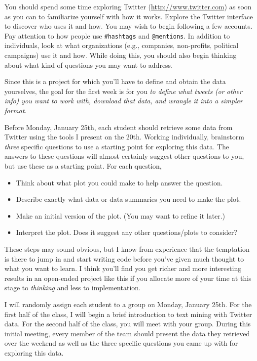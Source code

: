 \documentclass[11pt, oneside]{article}   	%
\begin{document}
You should spend some time exploring Twitter (\url{http://www.twitter.com}) as
soon as you can to familiarize yourself with how it works.  Explore the Twitter
interface to discover who uses it and how. You may wish to begin following
a few accounts.  Pay attention to how people use \verb|#hashtags| and
\verb|@mentions|.  In addition to individuals, look at what organizations
(e.g., companies, non-profits, political campaigns) use it and how.  While
doing this, you should also begin thinking about what kind of questions you may
want to address.

Since this is a project for which you'll have to define and obtain the data
yourselves, the goal for the first week is for you \emph{to define what tweets
(or other info) you want to work with, download that data, and wrangle it into
a simpler format}. 

Before Monday, January 25th, each student should retrieve some data from
Twitter using the tools I present on the 20th.  Working individually, 
brainstorm {\em three} specific
questions to use a starting point for exploring this data. The answers to these
questions will almost certainly suggest other questions to you, but use these
as a starting point.  For each question,
\begin{itemize}
\item Think about what plot you could make to help answer the question.
\item Describe exactly what data or data summaries you need to make the plot.
\item Make an initial version of the plot. (You may want to refine it later.)
\item Interpret the plot. Does it suggest any other questions/plots to consider?
\end{itemize}
These steps may sound obvious, but I know from experience that the temptation
is there to jump in and start writing code before you've given much thought to
what you want to learn. I think you'll find you get richer and more interesting
results in an open-ended project like this if you allocate more of your time at
this stage to {\em thinking} and less to implementation.

I will randomly assign each student to a group on Monday, January 25th.  For
the first half of the class, I will begin a brief introduction to text mining
with Twitter data.  For the second half of the class, you will meet with your
group.  During this initial meeting, every member of the team should present the
data they retrieved over the weekend as well as the three specific questions
you came up with for exploring this data.
\end{document}
